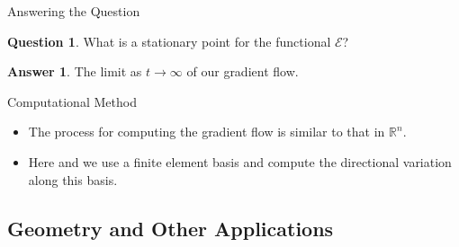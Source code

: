 \documentclass[usenames,dvipsnames]{beamer}
\theoremstyle{definition}
\newtheorem*{question}{Question}
\newtheorem*{answer}{Answer}
\theoremstyle{theorem}
\newcommand{\R}{\mathbb{R}}
\begin{document}
        
    \begin{frame}{Answering the Question}
        \begin{question}
        What is a stationary point for the functional $\mathcal{E}$?
        \end{question}
        
        \pause
        \begin{answer}
        The limit as $t\to \infty$ of our gradient flow.
        \end{answer}
    \end{frame}
    
    \begin{frame}{Computational Method}
    \begin{itemize}
        \item The process for computing the gradient flow is similar to that in $\R^n$.
        \item Here and we use a finite element basis and compute the directional variation along this basis.
    \end{itemize}
         
    \end{frame}
    
        
    
    \subsection{Geometry and Other Applications}
    
\end{document}
